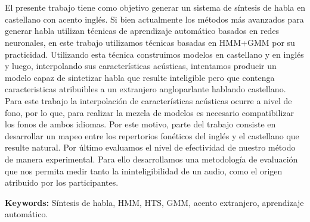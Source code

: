 \chapter*{\runtitle}

El presente trabajo tiene como objetivo generar un sistema de síntesis de habla en castellano con acento inglés. Si bien actualmente los métodos más avanzados para generar habla utilizan técnicas de aprendizaje automático basados en redes neuronales, en este trabajo utilizamos técnicas basadas en HMM+GMM por su practicidad. Utilizando esta técnica construimos modelos en castellano y en inglés y luego, interpolando sus características acústicas, intentamos producir un modelo capaz de sintetizar habla que resulte inteligible pero que contenga caracteristicas atribuibles a un extranjero angloparlante hablando castellano. Para este trabajo la interpolación de características acústicas ocurre a nivel de fono, por lo que, para realizar la mezcla de modelos es necesario compatibilizar los fonos de ambos idiomas. Por este motivo, parte del trabajo consiste en desarrollar un mapeo entre los repertorios fonéticos del inglés y el castellano que resulte natural. Por último evaluamos el nivel de efectividad de nuestro método de manera experimental. Para ello desarrollamos una metodología de evaluación que nos permita medir tanto la ininteligibilidad de un audio, como el origen atribuido por los participantes.

\bigskip

\noindent\textbf{Keywords:} Síntesis de habla, HMM, HTS, GMM, acento extranjero, aprendizaje automático.